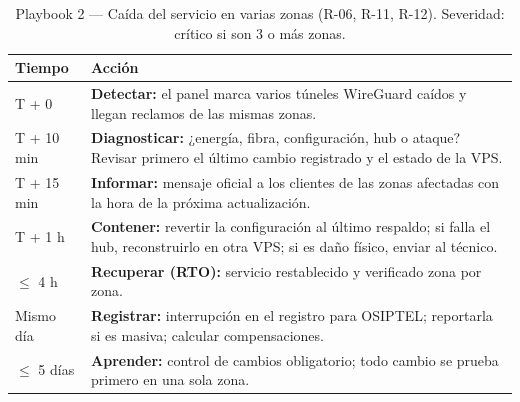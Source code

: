 \begin{table}[htbp]
\centering
\caption{Playbook 2 --- Caída del servicio en varias zonas (R-06, R-11, R-12). Severidad: crítico si son 3 o más zonas.}
\label{tab:anx-inc-pb2}
\small
\begin{tabularx}{\textwidth}{L{1.6cm}X}
\toprule
\textbf{Tiempo} & \textbf{Acción} \\
\midrule
T + 0 & \textbf{Detectar:} el panel marca varios túneles WireGuard caídos y llegan reclamos de las mismas zonas. \\
T + 10 min & \textbf{Diagnosticar:} ¿energía, fibra, configuración, hub o ataque? Revisar primero el último cambio registrado y el estado de la VPS. \\
T + 15 min & \textbf{Informar:} mensaje oficial a los clientes de las zonas afectadas con la hora de la próxima actualización. \\
T + 1 h & \textbf{Contener:} revertir la configuración al último respaldo; si falla el hub, reconstruirlo en otra VPS; si es daño físico, enviar al técnico. \\
$\leq$ 4 h & \textbf{Recuperar (RTO):} servicio restablecido y verificado zona por zona. \\
Mismo día & \textbf{Registrar:} interrupción en el registro para OSIPTEL; reportarla si es masiva; calcular compensaciones. \\
$\leq$ 5 días & \textbf{Aprender:} control de cambios obligatorio; todo cambio se prueba primero en una sola zona. \\
\bottomrule
\end{tabularx}
\end{table}

